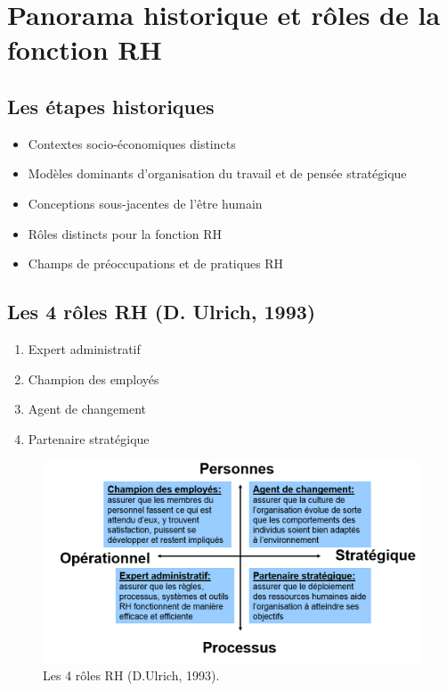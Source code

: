 \documentclass[12pt]{article}
\begin{document}
\section{Panorama historique et rôles de la fonction RH}
	\subsection{Les étapes historiques}
	  \begin{itemize}
	   \item Contextes socio-économiques distincts
	   \item Modèles dominants d'organisation du travail et de pensée stratégique
	   \item Conceptions sous-jacentes de l'être humain
	   \item Rôles distincts pour la fonction RH
	   \item Champs de préoccupations et de pratiques RH
	  \end{itemize}
	  
	  \subsection{Les 4 rôles RH (D. Ulrich, 1993)}
	  
	  \begin{enumerate}
	   \item Expert administratif
	   \item Champion des employés
	   \item Agent de changement
	   \item Partenaire stratégique
	  \end{enumerate}

	  \begin{figure}[h]
	  	\begin{center}
	  	\includegraphics[scale=0.5]{modele_ulrich.png}
	  	\caption{Les 4 rôles RH (D.Ulrich, 1993).}
	  	\label{modele_ulrich}
	  	\end{center}
	  \end{figure}
	  
\end{document}
